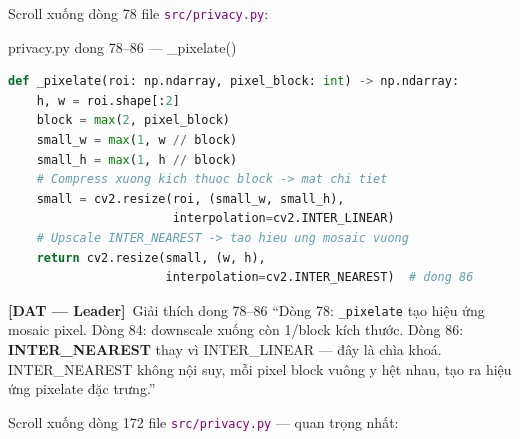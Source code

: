 \documentclass[12pt, a4paper]{article}
\newcommand{\dat}{\textcolor{BrickRed}{\textbf{[DAT --- Leader]}}}
\newcommand{\fpath}[1]{\texttt{\textcolor{purple}{#1}}}
\begin{document}
\begin{action}
Scroll xuống dòng 78 file \fpath{src/privacy.py}:
\end{action}

\begin{codestep}{privacy.py dong 78--86 --- \_pixelate()}
\begin{lstlisting}[language=Python, firstnumber=78]
def _pixelate(roi: np.ndarray, pixel_block: int) -> np.ndarray:
    h, w = roi.shape[:2]
    block = max(2, pixel_block)
    small_w = max(1, w // block)
    small_h = max(1, h // block)
    # Compress xuong kich thuoc block -> mat chi tiet
    small = cv2.resize(roi, (small_w, small_h),
                       interpolation=cv2.INTER_LINEAR)
    # Upscale INTER_NEAREST -> tao hieu ung mosaic vuong
    return cv2.resize(small, (w, h),
                      interpolation=cv2.INTER_NEAREST)  # dong 86
\end{lstlisting}
\end{codestep}

\begin{dialog}{\dat\ Giải thích dong 78--86}
``Dòng 78: \texttt{\_pixelate} tạo hiệu ứng mosaic pixel.
Dòng 84: downscale xuống còn 1/block kích thước.
Dòng 86: \textbf{INTER\_NEAREST} thay vì INTER\_LINEAR --- đây là chìa khoá.
INTER\_NEAREST không nội suy, mỗi pixel block vuông y hệt nhau,
tạo ra hiệu ứng pixelate đặc trưng.''
\end{dialog}

\begin{action}
Scroll xuống dòng 172 file \fpath{src/privacy.py} --- quan trọng nhất:
\end{action}
\end{document}
